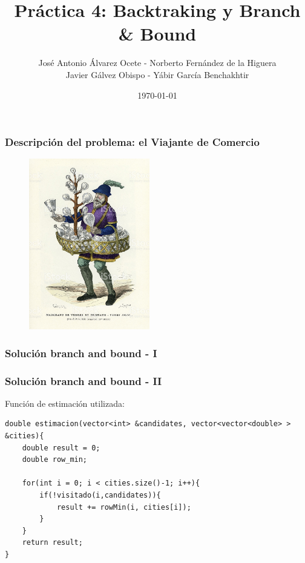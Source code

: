 \documentclass[spanish]{beamer}
\title{Práctica 4: Backtraking y Branch \& Bound}
\date{\today}
\author{José Antonio Álvarez Ocete - Norberto Fernández de la Higuera \\ Javier Gálvez Obispo - Yábir García Benchakhtir }
\institute{Doble Grado en Ingeniería Informática y Matemáticas}
\begin{document}
\frame{\titlepage}

\begin{frame}[fragile]\frametitle{Descripción del problema: el Viajante de Comercio}
\begin{figure}[H]
	\centering
	\includegraphics[width=0.47\textwidth]{comerciante.jpg}
	\caption{}
\end{figure}
\end{frame}

\begin{frame}[fragile]\frametitle{Solución branch and bound - I}

	
\end{frame}

\begin{frame}[fragile]\frametitle{Solución branch and bound - II}
	
Función de estimación utilizada:
	
\begin{lstlisting}
double estimacion(vector<int> &candidates, vector<vector<double> > &cities){
	double result = 0;
	double row_min;
	
	for(int i = 0; i < cities.size()-1; i++){
		if(!visitado(i,candidates)){
			result += rowMin(i, cities[i]);
		}
	}
	return result;
}
\end{lstlisting}
	
\end{frame}
\end{document}
